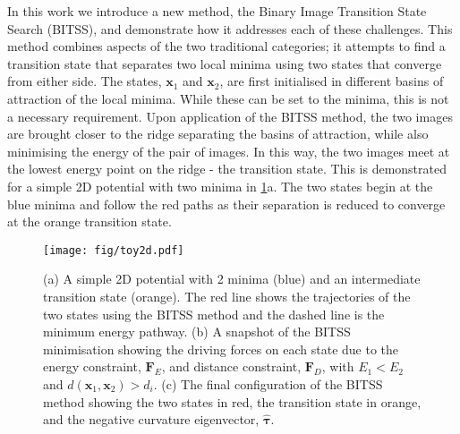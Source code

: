 \documentclass[aps,twocolumn]{revtex4-1}
\begin{document}
\topic In this work we introduce a new method, the Binary Image Transition State Search (BITSS), and demonstrate how it addresses each of these challenges.
This method combines aspects of the two traditional categories; it attempts to find a transition state that separates two local minima using two states that converge from either side.
The states, $\bm{x}_1$ and $\bm{x}_2$, are first initialised in different basins of attraction of the local minima.
While these can be set to the minima, this is not a necessary requirement.
Upon application of the BITSS method, the two images are brought closer to the ridge separating the basins of attraction, while also minimising the energy of the pair of images.
In this way, the two images meet at the lowest energy point on the ridge - the transition state.
This is demonstrated for a simple 2D potential with two minima in \cref{fig:toy2d}a.
The two states begin at the blue minima and follow the red paths as their separation is reduced to converge at the orange transition state.

\begin{figure}[htb]
  \centering
  \texttt{[image: fig/toy2d.pdf]}
  \caption{
    (a) A simple 2D potential with 2 minima (blue) and an intermediate transition state (orange).
        The red line shows the trajectories of the two states using the BITSS method and the dashed line is the minimum energy pathway.
    (b) A snapshot of the BITSS minimisation showing the driving forces on each state due to the energy constraint, $\bm{F}_E$, and distance constraint, $\bm{F}_D$, with $E_1 < E_2$ and $d(\bm{x}_1,\bm{x}_2) > d_i$.
    (c) The final configuration of the BITSS method showing the two states in red, the transition state in orange, and the negative curvature eigenvector, $\bm{\hat{\tau}}$.
  }
  \label{fig:toy2d}
\end{figure}
\end{document}
